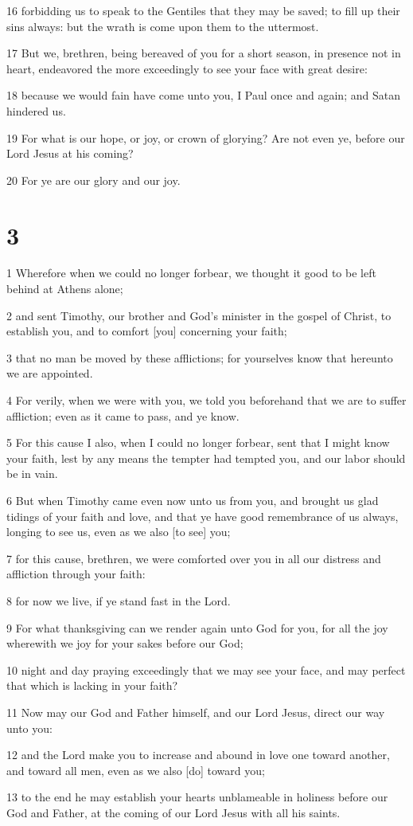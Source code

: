 \par 16 forbidding us to speak to the Gentiles that they may be saved; to fill up their sins always: but the wrath is come upon them to the uttermost.
\par 17 But we, brethren, being bereaved of you for a short season, in presence not in heart, endeavored the more exceedingly to see your face with great desire:
\par 18 because we would fain have come unto you, I Paul once and again; and Satan hindered us.
\par 19 For what is our hope, or joy, or crown of glorying? Are not even ye, before our Lord Jesus at his coming?
\par 20 For ye are our glory and our joy.

\chapter{3}

\par 1 Wherefore when we could no longer forbear, we thought it good to be left behind at Athens alone;
\par 2 and sent Timothy, our brother and God's minister in the gospel of Christ, to establish you, and to comfort [you] concerning your faith;
\par 3 that no man be moved by these afflictions; for yourselves know that hereunto we are appointed.
\par 4 For verily, when we were with you, we told you beforehand that we are to suffer affliction; even as it came to pass, and ye know.
\par 5 For this cause I also, when I could no longer forbear, sent that I might know your faith, lest by any means the tempter had tempted you, and our labor should be in vain.
\par 6 But when Timothy came even now unto us from you, and brought us glad tidings of your faith and love, and that ye have good remembrance of us always, longing to see us, even as we also [to see] you;
\par 7 for this cause, brethren, we were comforted over you in all our distress and affliction through your faith:
\par 8 for now we live, if ye stand fast in the Lord.
\par 9 For what thanksgiving can we render again unto God for you, for all the joy wherewith we joy for your sakes before our God;
\par 10 night and day praying exceedingly that we may see your face, and may perfect that which is lacking in your faith?
\par 11 Now may our God and Father himself, and our Lord Jesus, direct our way unto you:
\par 12 and the Lord make you to increase and abound in love one toward another, and toward all men, even as we also [do] toward you;
\par 13 to the end he may establish your hearts unblameable in holiness before our God and Father, at the coming of our Lord Jesus with all his saints.

